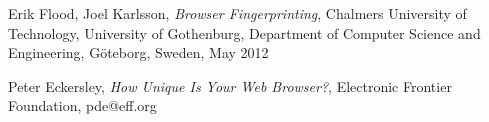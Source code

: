 \begin{thebibliography}{9}
	
	Erik Flood,
	Joel Karlsson,
	\textit{Browser Fingerprinting},
	Chalmers University of Technology,
	University of Gothenburg,
	Department of Computer Science and Engineering,
	Göteborg,
	Sweden,
	May 2012
	
	Peter Eckersley,
	\textit{How Unique Is Your Web Browser?},
	Electronic Frontier Foundation,
	pde@eff.org
	
\end{thebibliography}
